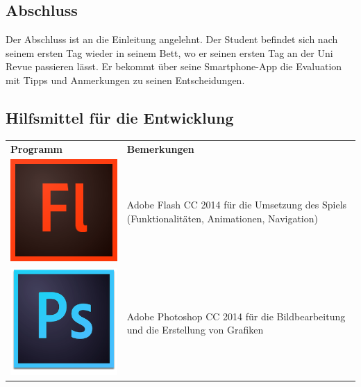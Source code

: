 \documentclass[a4paper, 11pt]{article} %
\begin{document}
\subsection{Abschluss}
Der Abschluss ist an die Einleitung angelehnt. Der Student befindet sich nach seinem ersten Tag wieder in seinem Bett, wo er seinen ersten Tag an der Uni Revue passieren lässt. Er bekommt über seine Smartphone-App die Evaluation mit Tipps und Anmerkungen zu seinen Entscheidungen. 

\subsection{Hilfsmittel für die Entwicklung}
\begin{tabular}{lp{9cm}}
\textbf{Programm} & \textbf{Bemerkungen} \\ 
\includegraphics[scale=0.35]{images/flash.png} & 
\nohyphens{
Adobe Flash CC 2014 für die Umsetzung des Spiels
(Funktionalitäten, Animationen, Navigation)
} \\
\includegraphics[scale=0.5]{images/photoshop.png} & 
\nohyphens{
Adobe Photoshop CC 2014 für die Bildbearbeitung und die Erstellung von Grafiken
} \\

\end{tabular}
\end{document}

